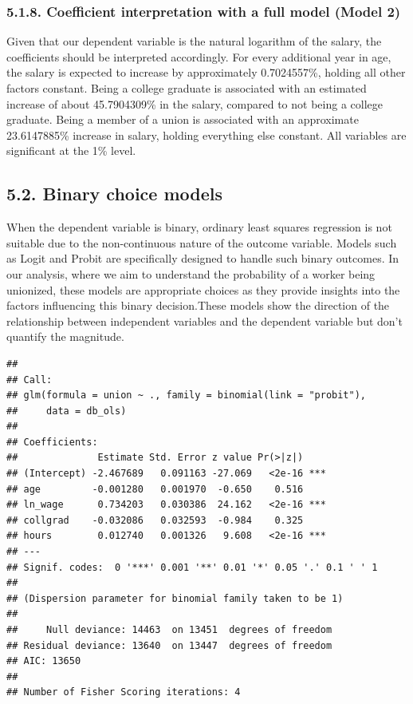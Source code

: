 \documentclass[
]{article}
\begin{document}
\hypertarget{coefficient-interpretation-with-a-full-model-model-2}{%
\subsubsection{5.1.8. Coefficient interpretation with a full model
(Model 2)}\label{coefficient-interpretation-with-a-full-model-model-2}}

Given that our dependent variable is the natural logarithm of the
salary, the coefficients should be interpreted accordingly. For every
additional year in age, the salary is expected to increase by
approximately 0.7024557\%, holding all other factors constant. Being a
college graduate is associated with an estimated increase of about
45.7904309\% in the salary, compared to not being a college graduate.
Being a member of a union is associated with an approximate 23.6147885\%
increase in salary, holding everything else constant. All variables are
significant at the 1\% level.

\hypertarget{binary-choice-models}{%
\subsection{5.2. Binary choice models}\label{binary-choice-models}}

When the dependent variable is binary, ordinary least squares regression
is not suitable due to the non-continuous nature of the outcome
variable. Models such as Logit and Probit are specifically designed to
handle such binary outcomes. In our analysis, where we aim to understand
the probability of a worker being unionized, these models are
appropriate choices as they provide insights into the factors
influencing this binary decision.These models show the direction of the
relationship between independent variables and the dependent variable
but don't quantify the magnitude.

\begin{verbatim}
## 
## Call:
## glm(formula = union ~ ., family = binomial(link = "probit"), 
##     data = db_ols)
## 
## Coefficients:
##              Estimate Std. Error z value Pr(>|z|)    
## (Intercept) -2.467689   0.091163 -27.069   <2e-16 ***
## age         -0.001280   0.001970  -0.650    0.516    
## ln_wage      0.734203   0.030386  24.162   <2e-16 ***
## collgrad    -0.032086   0.032593  -0.984    0.325    
## hours        0.012740   0.001326   9.608   <2e-16 ***
## ---
## Signif. codes:  0 '***' 0.001 '**' 0.01 '*' 0.05 '.' 0.1 ' ' 1
## 
## (Dispersion parameter for binomial family taken to be 1)
## 
##     Null deviance: 14463  on 13451  degrees of freedom
## Residual deviance: 13640  on 13447  degrees of freedom
## AIC: 13650
## 
## Number of Fisher Scoring iterations: 4
\end{verbatim}
\end{document}
